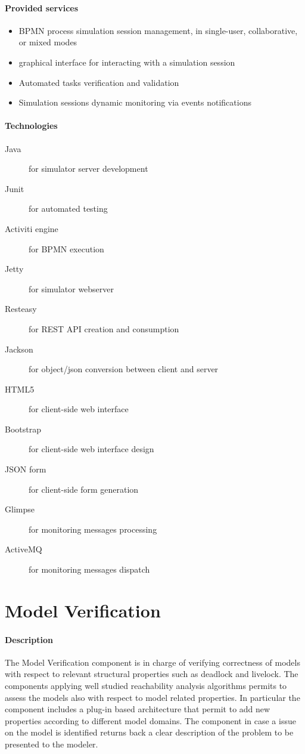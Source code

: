 \documentclass{learnpad}
\begin{document}
\paragraph{Provided services}
\begin{itemize}
	\item BPMN process simulation session management, in single-user, collaborative, or mixed modes
	\item graphical interface for interacting with a simulation session
	\item Automated tasks verification and validation
	\item Simulation sessions dynamic monitoring via events notifications
\end{itemize}

\paragraph{Technologies}
\begin{description}
	\item[Java] for simulator server development
	\item[Junit] for automated testing
	\item[Activiti engine] for BPMN execution
	\item[Jetty] for simulator webserver
	\item[Resteasy] for REST API creation and consumption
	\item[Jackson] for object/json conversion between client and server
	\item[HTML5] for client-side web interface
	\item[Bootstrap] for client-side web interface design
	\item[JSON form] for client-side form generation
	\item[Glimpse] for monitoring messages processing
	\item[ActiveMQ] for monitoring messages dispatch
\end{description}

\section{Model Verification}\label{sec:model-verification}
\paragraph{Description}
The Model Verification component is in charge of verifying correctness of models
with respect to relevant structural properties such as deadlock and livelock.
The components applying well studied reachability analysis algorithms permits to
assess the models also with respect to model related properties. In particular
the component includes a plug-in based architecture that permit to add new
properties according to different model domains. The component in case a issue
on the model is identified returns back a clear description of the problem to be
presented to the modeler.
\end{document}
